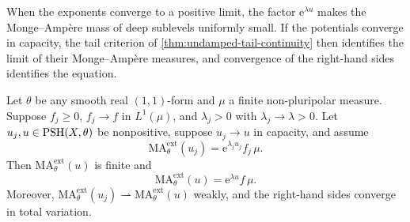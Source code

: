 When the exponents converge to a positive limit, the factor $\mathrm{e}^{\lambda u}$ makes the Monge--Amp\`ere mass of deep sublevels uniformly small. If the potentials converge in capacity, the tail criterion of \cref{thm:undamped-tail-continuity} then identifies the limit of their Monge--Amp\`ere measures, and convergence of the right-hand sides identifies the equation.

\begin{theorem}\label{thm:exponential-closedness}
Let $\theta$ be any smooth real $(1,1)$-form and $\mu$ a finite non-pluripolar measure. Suppose $f_j\geq0$, $f_j\to f$ in $L^1(\mu)$, and $\lambda_j>0$ with $\lambda_j\to\lambda>0$. Let $u_j,u\in\mathrm{PSH}(X,\theta)$ be nonpositive, suppose $u_j\to u$ in capacity, and assume
\[
 \mathrm{MA}^{\mathrm{ext}}_\theta(u_j)
     =\mathrm{e}^{\lambda_j u_j}f_j\,\mu.
\]
Then $\mathrm{MA}^{\mathrm{ext}}_\theta(u)$ is finite and
\[
 \mathrm{MA}^{\mathrm{ext}}_\theta(u)=\mathrm{e}^{\lambda u}f\,\mu.
\]
Moreover, $\mathrm{MA}^{\mathrm{ext}}_\theta(u_j)\rightharpoonup\mathrm{MA}^{\mathrm{ext}}_\theta(u)$ weakly, and the right-hand sides converge in total variation.
\end{theorem}
